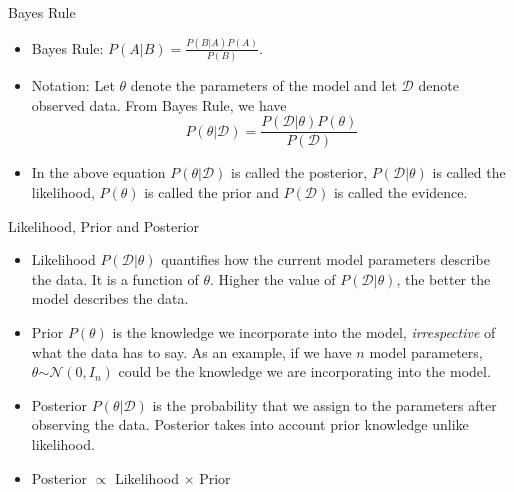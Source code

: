 \documentclass{beamer}
\begin{document}
	

\begin{frame}{Bayes Rule}
\begin{itemize}
	\item Bayes Rule: $P(A | B) = \frac{P(B|A)P(A)}{P(B)}$.
	\item Notation: Let $\theta$ denote the parameters of the model and let $\mathcal{D}$ denote observed data. From Bayes Rule, we have 
	\begin{equation*}
	    P(\theta | \mathcal{D}) = \frac{ P(\mathcal{D}|\theta)P(\theta) }{P(\mathcal{D})}
	\end{equation*}
	\item In the above equation $P(\theta | \mathcal{D})$ is called the posterior, $P(\mathcal{D}|\theta)$ is called the likelihood, $P(\theta)$ is called the prior and $P(\mathcal{D})$ is called the evidence.
	
\end{itemize}
\end{frame}
\begin{frame}{Likelihood, Prior and Posterior}
\begin{itemize}
	
	\item Likelihood $P(\mathcal{D}|\theta)$ quantifies how the current model parameters describe the data. It is a function of $\theta$.  Higher the value of $P(\mathcal{D}|\theta)$, the better the model describes the data.
	\item Prior $P(\theta)$ is the knowledge we incorporate into the model, \emph{irrespective} of what the data has to say. As an example, if we have $n$ model parameters, $\theta \stackrel{}{\sim} \mathcal{N}(0,I_n)$ could be the knowledge we are incorporating into the model.
	\item Posterior $P(\theta | \mathcal{D})$ is the probability that we assign to the parameters after observing the data. Posterior takes into account prior knowledge unlike likelihood.
	\item Posterior $\propto$ Likelihood $\times$ Prior
\end{itemize}
\end{frame}
\end{document}

